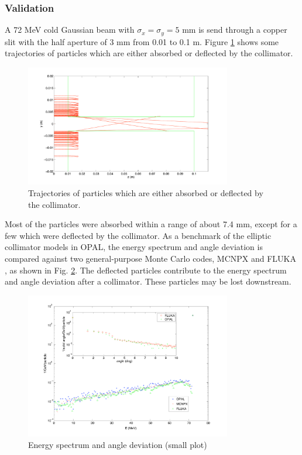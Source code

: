 \documentclass[acus]{JAC2003}
\begin{document}
\subsubsection{Validation}
A 72 MeV cold Gaussian beam with $\sigma_x=\sigma_y=5$ mm is send through a copper slit with the half aperture of $3$ mm from 0.01 to 0.1 m. 
Figure \ref{fig:trace3} shows some trajectories of particles which are either absorbed or deflected by the collimator. 
\begin{figure}[htb]
   \centering
  \includegraphics*[width=90mm]{trace3}
   \caption{Trajectories of particles which are either absorbed or deflected by the collimator.}
   \label{fig:trace3}
\end{figure}
Most of the particles  were absorbed within a range of about 7.4 mm, except for a few which were deflected by the collimator. 
As a benchmark of the elliptic collimator models in OPAL, the energy spectrum and angle deviation is compared against two general-purpose Monte Carlo codes, 
MCNPX \cite{MCNPX} and FLUKA \cite{FLUKA1,FLUKA2}, as shown in Fig. \ref{fig:spectandscatter}. 
The deflected particles contribute to the energy spectrum and angle deviation after a collimator. These particles may be lost downstream.
\begin{figure}[htb]
   \centering
  \includegraphics*[width=90mm]{spectandscatter}
   \caption{Energy spectrum and angle deviation (small plot)}
   \label{fig:spectandscatter}
\end{figure}
\end{document}
